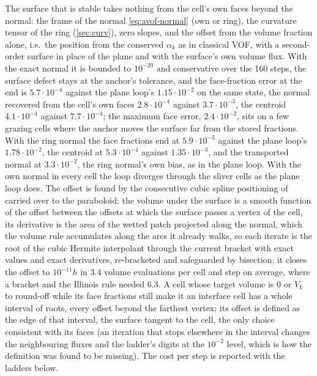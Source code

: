 \documentclass[preprint,12pt]{elsarticle}
\begin{document}
The surface that is stable takes nothing from the cell's own faces beyond the normal: the frame of the normal \cref{eq:avof-normal} (own or ring), the curvature tensor of the ring (\cref{sec:curv}), zero slopes, and the offset from the volume fraction alone, i.e.\ the position from the conserved $\alpha_k$ as in classical VOF, with a second-order surface in place of the plane and with the surface's own volume flux. With the exact normal it is bounded to $10^{-20}$ and conservative over the 160 steps, the surface defect stays at the anchor's tolerance, and the face-fraction error at the end is $5.7\cdot10^{-4}$ against the plane loop's $1.15\cdot10^{-2}$ on the same state, the normal recovered from the cell's own faces $2.8\cdot10^{-4}$ against $3.7\cdot10^{-3}$, the centroid $4.1\cdot10^{-4}$ against $7.7\cdot10^{-4}$; the maximum face error, $2.4\cdot10^{-2}$, sits on a few grazing cells where the anchor moves the surface far from the stored fractions. With the ring normal the face fractions end at $5.9\cdot10^{-3}$ against the plane loop's $1.78\cdot10^{-2}$, the centroid at $5.3\cdot10^{-4}$ against $1.35\cdot10^{-3}$, and the transported normal at $3.3\cdot10^{-2}$, the ring normal's own bias, as in the plane loop. With the own normal in every cell the loop diverges through the sliver cells as the plane loop does. The offset is found by the consecutive cubic spline positioning of \citet{Maric2021CCS} carried over to the paraboloid: the volume under the surface is a smooth function of the offset between the offsets at which the surface passes a vertex of the cell, its derivative is the area of the wetted patch projected along the normal, which the volume rule accumulates along the arcs it already walks, so each iterate is the root of the cubic Hermite interpolant through the current bracket with exact values and exact derivatives, re-bracketed and safeguarded by bisection; it closes the offset to $10^{-11} h$ in $3.4$ volume evaluations per cell and step on average, where a bracket and the Illinois rule needed $6.3$. A cell whose target volume is $0$ or $V_k$ to round-off while its face fractions still make it an interface cell has a whole interval of roots, every offset beyond the farthest vertex; its offset is defined as the edge of that interval, the surface tangent to the cell, the only choice consistent with its faces (an iteration that stops elsewhere in the interval changes the neighbouring fluxes and the ladder's digits at the $10^{-2}$ level, which is how the definition was found to be missing). The cost per step is reported with the ladders below.
\end{document}
